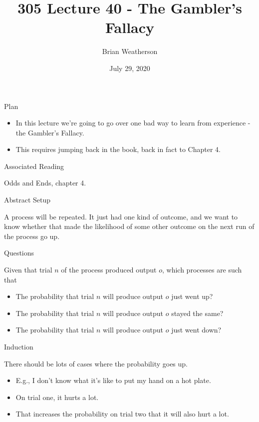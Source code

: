 \documentclass[
  ignorenonframetext,
]{beamer}
\title{305 Lecture 40 - The Gambler's Fallacy}
\author{Brian Weatherson}
\date{July 29, 2020}
\providecommand{\tightlist}{%
  \setlength{\itemsep}{0pt}\setlength{\parskip}{0pt}}
\renewcommand{\,}{\text{, }}
\begin{document}
\frame{\titlepage}

\begin{frame}{Plan}
\protect\hypertarget{plan}{}

\begin{itemize}
\tightlist
\item
  In this lecture we're going to go over one bad way to learn from
  experience - the Gambler's Fallacy.
\item
  This requires jumping back in the book, back in fact to Chapter 4.
\end{itemize}

\end{frame}

\begin{frame}{Associated Reading}
\protect\hypertarget{associated-reading}{}

Odds and Ends, chapter 4.

\end{frame}

\begin{frame}{Abstract Setup}
\protect\hypertarget{abstract-setup}{}

A process will be repeated. It just had one kind of outcome, and we want
to know whether that made the likelihood of some other outcome on the
next run of the process go up.

\end{frame}

\begin{frame}{Questions}
\protect\hypertarget{questions}{}

Given that trial \(n\) of the process produced output \(o\), which
processes are such that

\begin{itemize}
\tightlist
\item
  The probability that trial \(n\) will produce output \(o\) just went
  up?
\item
  The probability that trial \(n\) will produce output \(o\) stayed the
  same?
\item
  The probability that trial \(n\) will produce output \(o\) just went
  down?
\end{itemize}

\end{frame}

\begin{frame}{Induction}
\protect\hypertarget{induction}{}

There should be lots of cases where the probability goes up.

\begin{itemize}[<+->]
\tightlist
\item
  E.g., I don't know what it's like to put my hand on a hot plate.
\item
  On trial one, it hurts a lot.
\item
  That increases the probability on trial two that it will also hurt a
  lot.
\end{itemize}

\end{frame}
\end{document}

